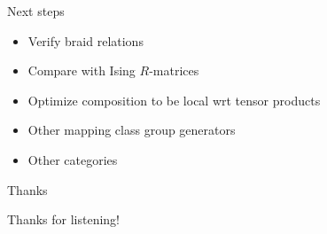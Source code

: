 \documentclass{beamer}
\DeclareMathOperator{\ev}{ev}
\DeclareMathOperator{\coev}{coev}
\newcommand{\img}[1]{
\vfill
\centering
\texttt{[image: \#1]}
\vfill
}
\begin{document}



\begin{frame}{Next steps}
\begin{itemize}
\item Verify braid relations
\item Compare with Ising $R$-matrices
\item Optimize composition to be local wrt tensor products
\item Other mapping class group generators
\item Other categories
\end{itemize}
\end{frame}

\begin{frame}{Thanks}

Thanks for listening!

\end{frame}
\end{document}

